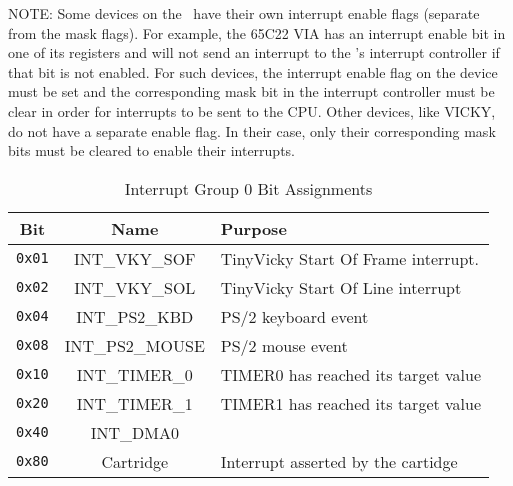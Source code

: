 NOTE: Some devices on the \jr\ have their own interrupt enable flags (separate from the mask flags). For example, the 65C22 VIA has an interrupt enable bit in one of its registers and will not send an interrupt to the \jr's interrupt controller if that bit is not enabled. For such devices, the interrupt enable flag on the device must be set and the corresponding mask bit in the interrupt controller must be clear in order for interrupts to be sent to the CPU. Other devices, like VICKY, do not have a separate enable flag. In their case, only their corresponding mask bits must be cleared to enable their interrupts.

\begin{table}[ht]
	\begin{center}
		\begin{tabular}{|c|c|l|} \hline
            Bit & Name & Purpose \\ \hline\hline
            \verb+0x01+ & INT\_VKY\_SOF & TinyVicky Start Of Frame interrupt. \\ \hline
            \verb+0x02+ & INT\_VKY\_SOL & TinyVicky Start Of Line interrupt \\ \hline
            \verb+0x04+ & INT\_PS2\_KBD & PS/2 keyboard event \\ \hline
            \verb+0x08+ & INT\_PS2\_MOUSE & PS/2 mouse event \\ \hline
            \verb+0x10+ & INT\_TIMER\_0 & TIMER0 has reached its target value \\ \hline
            \verb+0x20+ & INT\_TIMER\_1 & TIMER1 has reached its target value \\ \hline
            \verb+0x40+ & INT\_DMA0  \\ \hline
            \verb+0x80+ & Cartridge & Interrupt asserted by the cartidge \\ \hline
        \end{tabular}
    \end{center}
	\caption{Interrupt Group 0 Bit Assignments}
	\label{tab:int_group_0}
\end{table}

